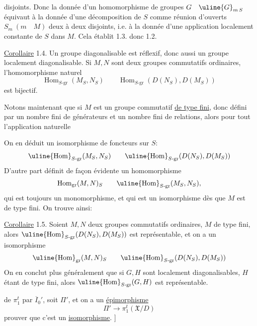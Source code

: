 disjoints. Donc la donnée d'un homomorphisme de groupes
$G\quad\uline{G}_{m\,S}$
équivaut à la donnée d'une décomposition de $S$ comme réunion d'ouverts
$S_m\ (m\quad M)$ deux à deux disjoints, i.e. à la donnée d'une application
localement constante de $S$ dans $M$. Cela établit 1.3. donc 1.2.

\uline{Corollaire} 1.4. Un groupe diagonalisable est réflexif, donc aussi un
groupe localement diagonalisable. Si $M,N$ sont deux groupes commutatifs
ordinaires,  l'homomorphisme naturel
\[
\operatorname{Hom}_{S\text{-gr}}(M_S,N_S)
\qquad
\operatorname{Hom}_{S\text{-gr}}(D(N_S),D(M_S))
\]
est bijectif.

Notons maintenant que si $M$ est un groupe commutatif \uline{de type fini},
 donc défini par un nombre fini de générateurs et un nombre fini de
relations, alors pour tout
l'application naturelle

On en déduit un isomorphisme de foncteurs sur $S$:
\[
\uline{\operatorname{Hom}}_{S\text{-gr}}(M_S,N_S)
\qquad
\uline{\operatorname{Hom}}_{S\text{-gr}}(D(N_S),D(M_S))
\]
D'autre part  définit de façon évidente un homomorphisme
\[
\operatorname{Hom}_{\mathrm{gr}}(M,N)_S
\qquad
\uline{\operatorname{Hom}}_{S\text{-gr}}(M_S,N_S),
\]
qui est toujours  un monomorphisme, et qui est un isomorphisme dès
que $M$ est de type fini. On trouve ainsi:

\uline{Corollaire} 1.5. 
Soient $M,N$ deux groupes commutatifs
ordinaires, $M$ de type fini, alors 
$\uline{\operatorname{Hom}}_{S\text{-gr}}(D(N_S),D(M_S))$ est
représentable, et on a un isomorphisme
\[
\uline{\operatorname{Hom}}_{\mathrm{gr}}(M,N)_S
\qquad
\uline{\operatorname{Hom}}_{S\text{-gr}}(D(N_S),D(M_S))
\]
On en conclut plus généralement que si $G,H$ sont localement diagonalisables,
$H$ étant de type fini, alors
$\uline{\operatorname{Hom}}_{S\text{-gr}}(G,H)$ est représentable.

de $\pi_1^t$ par $\overline I_0'$, soit
 $\Pi'$, et on a
  un \uline{épimorphisme}
\[
 \Pi'\longrightarrow\pi_1^t(\mathfrak X/D)
\]
prouver que c'est un \uline{isomorphisme}. ]

